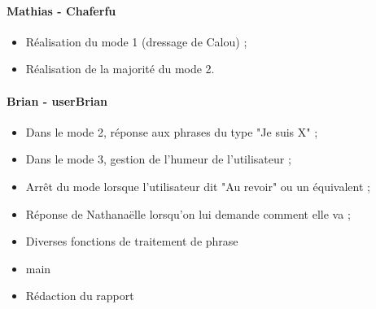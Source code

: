 \documentclass[paper=a4, fontsize=11pt]{article}
\begin{document}
\paragraph{Mathias - Chaferfu} 
\begin{itemize}
\item Réalisation du mode 1 (dressage de Calou) ;
\item Réalisation de la majorité du mode 2.
\end{itemize}

\paragraph{Brian - userBrian} 
\begin{itemize}
\item Dans le mode 2, réponse aux phrases du type "Je suis X" ;
\item Dans le mode 3, gestion de l'humeur de l'utilisateur ;
\item Arrêt du mode lorsque l'utilisateur dit "Au revoir" ou un équivalent ;
\item Réponse de Nathanaëlle lorsqu'on lui demande comment elle va ;
\item Diverses fonctions de traitement de phrase
\item main
\item Rédaction du rapport
\end{itemize}
\end{document}
